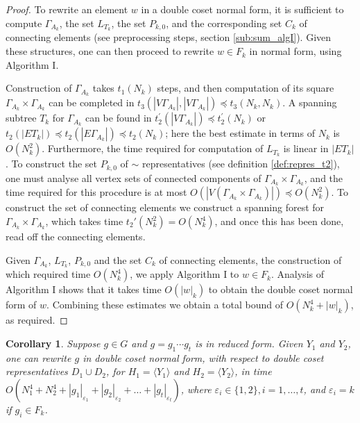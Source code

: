 \documentclass[a4paper,12pt]{article}
\newcommand{\G}{\Gamma }
\newcommand{\e}{\varepsilon }
\newtheorem{corollary}[theorem]{Corollary}
\numberwithin{equation}{section}
\numberwithin{figure}{section}
\newcommand{\la}{\langle}
\newcommand{\ra}{\rangle}
\begin{document}
\begin{proof}
To rewrite an element $w$ in a double coset normal form, it is
sufficient to compute $\G_{A_k}$, the set $L_{T_k}$,
the set $P_{k,0}$, and the
corresponding  set $C_k$ of connecting elements (see preprocessing steps, section \ref{sub:sum_algI}).
 Given these structures, one can then proceed to rewrite $w \in
F_k$ in normal form, using Algorithm I.

Construction of $\G_{A_k}$ takes  $t_1(N_k)$ steps, and then
computation of its square
 $\G_{A_k} \times \G_{A_k}$ can be completed in
 $t_3(|V\G_{A_k}|,|V\G_{A_k}|) \preceq t_3(N_k,N_k)$.
A spanning subtree $T_k$ for $\G_{A_k}$ can be found in
$t^{\prime}_2(|V\G_{A_k}|) \preceq t^{\prime}_2(N_k)$ or $t_2(|E
T_k|) \preceq t_2(|E\G_{A_k}|) \preceq t_2(N_k)$; here the best
estimate in terms of $N_k$ is $O(N_k^2)$. Furthermore, the time
required for computation of $L_{T_k}$ is linear in $|E T_k|$.
To construct the set $P_{k,0}$ of $\sim$
representatives (see definition \ref{def:repres_t2}), one must
analyse all vertex sets of connected components of $\G_{A_k}
\times \G_{A_k}$, and the time  required for this procedure is at
most $O(|V(\G_{A_k} \times \G_{A_k})|) \preceq O(N^2_k)$. To construct
the set of connecting elements we construct a spanning forest for
$\G_{A_k} \times \G_{A_k}$, which takes time $t_2'(N_k^2)
=O(N_k^4)$, and once this
has been done, read off the connecting elements.

Given $\G_{A_k}$, $L_{T_k}$, $P_{k,0}$ and the set $C_k$ of connecting elements,
the construction of which required time
 $O(N^4_k)$,
 we apply Algorithm I to $w \in F_k$. Analysis
of Algorithm I shows that it takes time  $O(|w|_k)$  to obtain
the double coset normal form of $w$. Combining these estimates
 we obtain a total bound of $O(N^4_k + |w|_k)$, as required.
\end{proof}

\begin{corollary}\label{cor:dcnf_time} Suppose $g \in G$ and $g=g_1 \cdots g_t$ is in reduced
form. Given $Y_1$ and $Y_2$, one can rewrite $g$ in double coset normal
form, with respect to double coset representatives $D_1\cup D_2$, for 
$H_1=\la Y_1\ra$ and $H_2=\la Y_2\ra$, in time  $O(N^4_1+ N^4_2 + |g_1|_{\e_1}+|g_2|_{\e_2}+
\ldots +|g_t|_{\e_t})$, where $\e_i \in \{ 1, 2\}, i = 1, \ldots,
t$, and $\e_i = k$ if $g_i \in F_k$.
\end{corollary}
\end{document}
